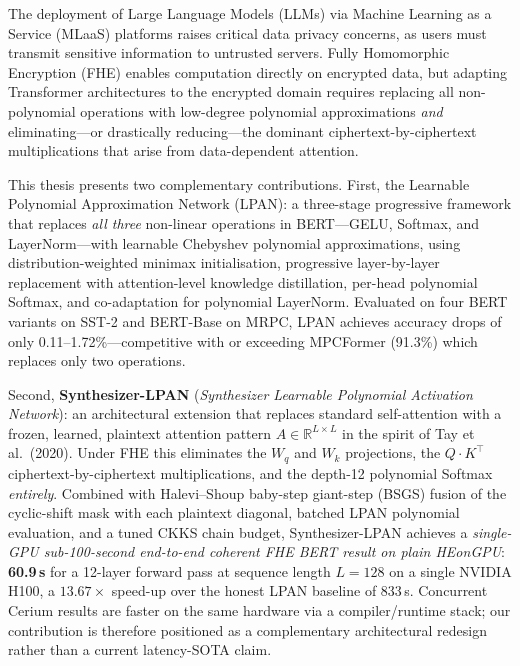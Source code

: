\begin{abstractenv}
    The deployment of Large Language Models (LLMs) via Machine Learning as a Service (MLaaS) platforms raises critical data privacy concerns, as users must transmit sensitive information to untrusted servers. Fully Homomorphic Encryption (FHE) enables computation directly on encrypted data, but adapting Transformer architectures to the encrypted domain requires replacing all non-polynomial operations with low-degree polynomial approximations \emph{and} eliminating---or drastically reducing---the dominant ciphertext-by-ciphertext multiplications that arise from data-dependent attention.

    This thesis presents two complementary contributions. First, the Learnable Polynomial Approximation Network (LPAN): a three-stage progressive framework that replaces \emph{all three} non-linear operations in BERT---GELU, Softmax, and LayerNorm---with learnable Chebyshev polynomial approximations, using distribution-weighted minimax initialisation, progressive layer-by-layer replacement with attention-level knowledge distillation, per-head polynomial Softmax, and co-adaptation for polynomial LayerNorm. Evaluated on four BERT variants on SST-2 and BERT-Base on MRPC, LPAN achieves accuracy drops of only 0.11--1.72\%---competitive with or exceeding MPCFormer (91.3\%) which replaces only two operations.

    Second, \textbf{Synthesizer-LPAN} (\emph{Synthesizer Learnable Polynomial Activation Network}): an architectural extension that replaces standard self-attention with a frozen, learned, plaintext attention pattern $A \in \mathbb{R}^{L\times L}$ in the spirit of Tay et al.\ (2020). Under FHE this eliminates the $W_q$ and $W_k$ projections, the $Q\!\cdot\!K^\top$ ciphertext-by-ciphertext multiplications, and the depth-12 polynomial Softmax \emph{entirely}. Combined with Halevi--Shoup baby-step giant-step (BSGS) fusion of the cyclic-shift mask with each plaintext diagonal, batched LPAN polynomial evaluation, and a tuned CKKS chain budget, Synthesizer-LPAN achieves a \emph{single-GPU sub-100-second end-to-end coherent FHE BERT result on plain HEonGPU}: \textbf{60.9\,s} for a 12-layer forward pass at sequence length $L{=}128$ on a single NVIDIA H100, a $\mathbf{13.67\times}$ speed-up over the honest LPAN baseline of $833$\,s. Concurrent Cerium results are faster on the same hardware via a compiler/runtime stack; our contribution is therefore positioned as a complementary architectural redesign rather than a current latency-SOTA claim.

\end{abstractenv}